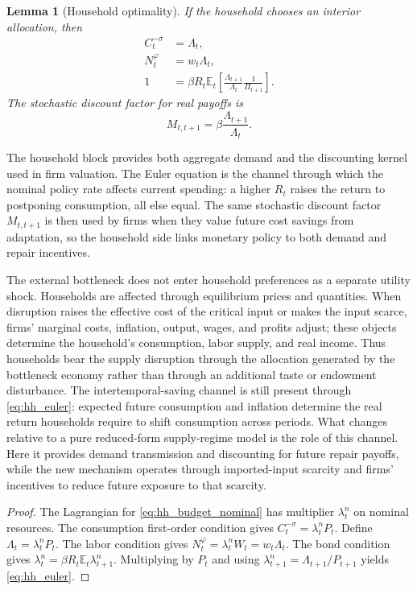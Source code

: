 ﻿\documentclass[12pt]{article}
\newtheorem{lemma}{Lemma}
\theoremstyle{remark}
\newcommand{\E}{\mathbb E}
\begin{document}
\begin{lemma}[Household optimality]\label{lem:hh_focs}
If the household chooses an interior allocation, then
\begin{align}
    C_t^{-\sigma} &= \Lambda_t, \label{eq:hh_muc}\\
    N_t^\varphi &= w_t\Lambda_t, \label{eq:hh_labor}\\
    1 &= \beta R_t\E_t
    \left[
        \frac{\Lambda_{t+1}}{\Lambda_t}
        \frac{1}{\Pi_{t+1}}
    \right].
    \label{eq:hh_euler}
\end{align}
The stochastic discount factor for real payoffs is
\begin{equation}
    M_{t,t+1}
    =
    \beta\frac{\Lambda_{t+1}}{\Lambda_t}.
    \label{eq:sdf}
\end{equation}
\end{lemma}

The household block provides both aggregate demand and the discounting kernel used in firm
valuation. The Euler equation is the channel through which the nominal policy rate affects current
spending: a higher $R_t$ raises the return to postponing consumption, all else equal. The same
stochastic discount factor $M_{t,t+1}$ is then used by firms when they value future cost savings
from adaptation, so the household side links monetary policy to both demand and repair incentives.

The external bottleneck does not enter household preferences as a separate utility shock. Households
are affected through equilibrium prices and quantities. When disruption raises the effective cost
of the critical input or makes the input scarce, firms' marginal costs, inflation, output, wages,
and profits adjust; these objects determine the household's consumption, labor supply, and real
income. Thus households bear the supply disruption through the allocation generated by the
bottleneck economy rather than through an additional taste or endowment disturbance.
The intertemporal-saving channel is still present through \eqref{eq:hh_euler}: expected future
consumption and inflation determine the real return households require to shift consumption across
periods. What changes relative to a pure reduced-form supply-regime model is the role of this
channel. Here it provides demand transmission and discounting for future repair payoffs, while the
new mechanism operates through imported-input scarcity and firms' incentives to reduce future
exposure to that scarcity.

\begin{proof}
The Lagrangian for \eqref{eq:hh_budget_nominal} has multiplier $\lambda_t^n$ on nominal resources.
The consumption first-order condition gives $C_t^{-\sigma}=\lambda_t^n P_t$. Define
$\Lambda_t=\lambda_t^nP_t$. The labor condition gives $N_t^\varphi=\lambda_t^n W_t=w_t\Lambda_t$.
The bond condition gives $\lambda_t^n=\beta R_t\E_t\lambda_{t+1}^n$. Multiplying by $P_t$ and using
$\lambda_{t+1}^n=\Lambda_{t+1}/P_{t+1}$ yields \eqref{eq:hh_euler}.
\end{proof}
\end{document}
